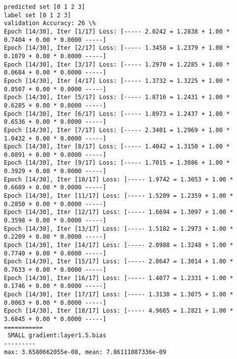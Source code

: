 \documentclass[11pt]{article}
\begin{document}
    \begin{Verbatim}[commandchars=\\\{\}]
predicted set [0 1 2 3]
label set [0 1 2 3]
validation Accuracy: 26 \%
Epoch [14/30], Iter [1/17] Loss: [----- 2.0242 = 1.2838 + 1.00 * 0.7404 + 0.00 * 0.0000 -----]
Epoch [14/30], Iter [2/17] Loss: [----- 1.3458 = 1.2379 + 1.00 * 0.1079 + 0.00 * 0.0000 -----]
Epoch [14/30], Iter [3/17] Loss: [----- 1.2970 = 1.2285 + 1.00 * 0.0684 + 0.00 * 0.0000 -----]
Epoch [14/30], Iter [4/17] Loss: [----- 1.3732 = 1.3225 + 1.00 * 0.0507 + 0.00 * 0.0000 -----]
Epoch [14/30], Iter [5/17] Loss: [----- 1.8716 = 1.2431 + 1.00 * 0.6285 + 0.00 * 0.0000 -----]
Epoch [14/30], Iter [6/17] Loss: [----- 1.8973 = 1.2437 + 1.00 * 0.6536 + 0.00 * 0.0000 -----]
Epoch [14/30], Iter [7/17] Loss: [----- 2.3401 = 1.2969 + 1.00 * 1.0432 + 0.00 * 0.0000 -----]
Epoch [14/30], Iter [8/17] Loss: [----- 1.4042 = 1.3150 + 1.00 * 0.0891 + 0.00 * 0.0000 -----]
Epoch [14/30], Iter [9/17] Loss: [----- 1.7015 = 1.3086 + 1.00 * 0.3929 + 0.00 * 0.0000 -----]
Epoch [14/30], Iter [10/17] Loss: [----- 1.9742 = 1.3053 + 1.00 * 0.6689 + 0.00 * 0.0000 -----]
Epoch [14/30], Iter [11/17] Loss: [----- 1.5209 = 1.2359 + 1.00 * 0.2850 + 0.00 * 0.0000 -----]
Epoch [14/30], Iter [12/17] Loss: [----- 1.6694 = 1.3097 + 1.00 * 0.3598 + 0.00 * 0.0000 -----]
Epoch [14/30], Iter [13/17] Loss: [----- 1.5182 = 1.2973 + 1.00 * 0.2209 + 0.00 * 0.0000 -----]
Epoch [14/30], Iter [14/17] Loss: [----- 2.0988 = 1.3248 + 1.00 * 0.7740 + 0.00 * 0.0000 -----]
Epoch [14/30], Iter [15/17] Loss: [----- 2.0647 = 1.3014 + 1.00 * 0.7633 + 0.00 * 0.0000 -----]
Epoch [14/30], Iter [16/17] Loss: [----- 1.4077 = 1.2331 + 1.00 * 0.1746 + 0.00 * 0.0000 -----]
Epoch [14/30], Iter [17/17] Loss: [----- 1.3138 = 1.3075 + 1.00 * 0.0063 + 0.00 * 0.0000 -----]
Epoch [14/30], Iter [18/17] Loss: [----- 4.9665 = 1.2821 + 1.00 * 3.6845 + 0.00 * 0.0000 -----]
===========
 SMALL gradient:layer1.5.bias
---------
max: 3.6580662055e-08, mean: 7.86111087336e-09

    \end{Verbatim}

    \begin{center}
    \end{center}
    { \hspace*{\fill} \\}
    
    \begin{center}
    \end{center}
    { \hspace*{\fill} \\}
    
\end{document}
